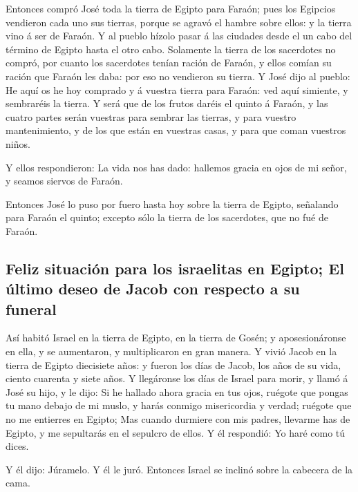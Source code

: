  Entonces compró José toda la tierra de Egipto para Faraón;
pues los Egipcios vendieron cada uno sus tierras, porque se agravó el
hambre sobre ellos: y la tierra vino á ser de Faraón.  Y al
pueblo hízolo pasar á las ciudades desde el un cabo del término de
Egipto hasta el otro cabo.  Solamente la tierra de los
sacerdotes no compró, por cuanto los sacerdotes tenían ración de Faraón,
y ellos comían su ración que Faraón les daba: por eso no vendieron su
tierra.  Y José dijo al pueblo: He aquí os he hoy comprado
y á vuestra tierra para Faraón: ved aquí simiente, y sembraréis la
tierra.  Y será que de los frutos daréis el quinto á
Faraón, y las cuatro partes serán vuestras para sembrar las tierras, y
para vuestro mantenimiento, y de los que están en vuestras casas, y para
que coman vuestros niños.

 Y ellos respondieron: La vida nos has dado: hallemos
gracia en ojos de mi señor, y seamos siervos de Faraón.

 Entonces José lo puso por fuero hasta hoy sobre la tierra
de Egipto, señalando para Faraón el quinto; excepto sólo la tierra de
los sacerdotes, que no fué de Faraón.

\hypertarget{feliz-situaciuxf3n-para-los-israelitas-en-egipto-el-uxfaltimo-deseo-de-jacob-con-respecto-a-su-funeral}{%
\subsection{Feliz situación para los israelitas en Egipto; El último
deseo de Jacob con respecto a su
funeral}\label{feliz-situaciuxf3n-para-los-israelitas-en-egipto-el-uxfaltimo-deseo-de-jacob-con-respecto-a-su-funeral}}

 Así habitó Israel en la tierra de Egipto, en la tierra de
Gosén; y aposesionáronse en ella, y se aumentaron, y multiplicaron en
gran manera.  Y vivió Jacob en la tierra de Egipto
diecisiete años: y fueron los días de Jacob, los años de su vida, ciento
cuarenta y siete años.  Y llegáronse los días de Israel
para morir, y llamó á José su hijo, y le dijo: Si he hallado ahora
gracia en tus ojos, ruégote que pongas tu mano debajo de mi muslo, y
harás conmigo misericordia y verdad; ruégote que no me entierres en
Egipto;  Mas cuando durmiere con mis padres, llevarme has
de Egipto, y me sepultarás en el sepulcro de ellos. Y él respondió: Yo
haré como tú dices.

 Y él dijo: Júramelo. Y él le juró. Entonces Israel se
inclinó sobre la cabecera de la cama.

